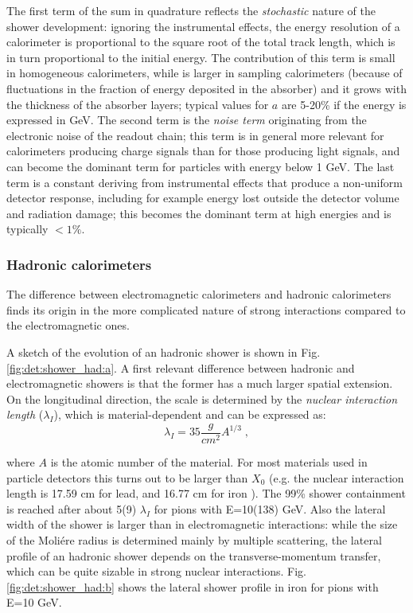 \noindent The first term of the sum in quadrature reflects the \textit{stochastic} nature of the shower development: ignoring the instrumental effects, the energy resolution of a calorimeter is proportional to the square root of the total track length, which is in turn proportional to the initial energy. The contribution of this term is small in homogeneous calorimeters, while is larger in sampling calorimeters (because of fluctuations in the fraction of energy deposited in the absorber) and it grows with the thickness of the absorber layers; typical values for $a$ are 5-20\% if the energy is expressed in GeV. The second term is the \textit{noise term} originating from the electronic noise of the readout chain; this term is in general more relevant for calorimeters producing charge signals than for those producing light signals, and can become the dominant term for particles with energy below 1 GeV. The last term is a constant deriving from instrumental effects that produce a non-uniform detector response, including for example energy lost outside the detector volume and radiation damage; this becomes the dominant term at high energies and is typically $<1\%$. 



\subsubsection*{Hadronic calorimeters}

The difference between electromagnetic calorimeters and hadronic calorimeters finds its origin in the more complicated nature of strong interactions compared to the electromagnetic ones. 

A sketch of the evolution of an hadronic shower is shown in Fig. \ref{fig:det:shower_had:a}. A first relevant difference between hadronic and electromagnetic showers is that the former has a much larger spatial extension. On the longitudinal direction, the scale is determined by the \textit{nuclear interaction length} ($\lambda_I$), which is material-dependent and can be expressed as:
\begin{equation}
\lambda_I = 35 \frac{g}{cm^2} A^{1/3} \; ,
\end{equation}

\noindent where $A$ is the atomic number of the material. For most materials used in particle detectors this turns out to be larger than $X_0$ (e.g. the nuclear interaction length is 17.59 cm for lead, and 16.77 cm for iron \cite{Patrignani:2016xqp}). The 99\% shower containment is reached after about 5(9) $\lambda_I$ for pions with E=10(138) GeV. Also the lateral width of the shower is larger than in electromagnetic interactions: while the size of the Moli\'ere radius is determined mainly by multiple scattering, the lateral profile of an hadronic shower depends on the transverse-momentum transfer, which can be quite sizable in strong nuclear interactions. Fig. \ref{fig:det:shower_had:b} shows the lateral shower profile in iron for pions with E=10 GeV.

